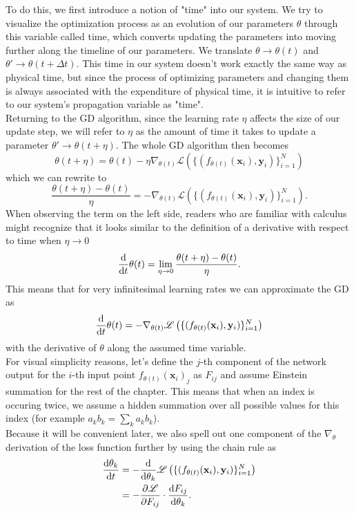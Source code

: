 To do this, we first introduce a notion of "time" into our system. We try to visualize the optimization process as an evolution of our parameters $\theta$ through this variable called time, which converts updating the parameters into moving further along the timeline of our parameters. We translate $\theta \rightarrow \theta(t)$ and $\theta' \rightarrow \theta(t+\Delta t)$. This time in our system doesn't work exactly the same way as physical time, but since the process of optimizing parameters and changing them is always associated with the expenditure of physical time, it is intuitive to refer to our system's propagation variable as "time". \\
Returning to the GD algorithm, since the learning rate $\eta$ affects the size of our update step, we will refer to $\eta$ as the amount of time it takes to update a parameter $\theta' \rightarrow \theta(t+\eta)$. The whole GD algorithm then becomes
\begin{equation}
	\theta(t+\eta) = \theta(t) - \eta \nabla_{\theta(t)} \mathscr{L}\left( \{(f_{\theta(t)}(\mathbf{x}_i), \mathbf{y}_i)\}_{i=1}^{N} \right)
\end{equation}
which we can rewrite to 
\begin{equation}
	\frac{\theta(t+\eta)-\theta(t)}{\eta} = - \nabla_{\theta(t)} \mathscr{L}\left( \{(f_{\theta(t)}(\mathbf{x}_i), \mathbf{y}_i)\}_{i=1}^{N} \right).
\end{equation}
When observing the term on the left side, readers who are familiar with calculus might recognize that it looks similar to the definition of a derivative with respect to time when $\eta \rightarrow 0$
\begin{equation}
	\frac{\mathrm{d}}{\mathrm{d}t}\theta(t) = \lim_{\eta\rightarrow0} \frac{\theta(t+\eta)-\theta(t)}{\eta}.
\end{equation}
This means that for very infinitesimal learning rates we can approximate the GD as 
\begin{equation}\label{eq:NTKThetaDerivative}
	\frac{\mathrm{d}}{\mathrm{d}t}\theta(t) = - \nabla_{\theta(t)} \mathscr{L}\left( \{(f_{\theta(t)}(\mathbf{x}_i), \mathbf{y}_i)\}_{i=1}^{N} \right)
\end{equation}
with the derivative of $\theta$ along the assumed time variable.\\
For visual simplicity reasons, let's define the $j$-th component of the network output for the $i$-th input point $f_{\theta(t)}(\mathbf{x}_i)_j$ as $F_{ij}$ and assume Einstein summation for the rest of the chapter.
This means that when an index is occuring twice, we assume a hidden summation over all possible values for this index (for example $a_kb_k = \sum_k a_kb_k$).\\
Because it will be convenient later, we also spell out one component of the $\nabla_\theta$ derivation of the loss function further by using the chain rule as
\begin{align}
	\frac{\mathrm{d}\theta_k}{\mathrm{d}t} &= - \frac{\mathrm{d}}{\mathrm{d}\theta_k}\mathscr{L}\left( \{(f_{\theta(t)}(\mathbf{x}_i), \mathbf{y}_i)\}_{i=1}^{N} \right)\nonumber\\
	&= - \frac{\partial\mathscr{L}}{\partial F_{ij}} \cdot \frac{\mathrm{d}F_{ij}}{\mathrm{d}\theta_k}.
\end{align} 

